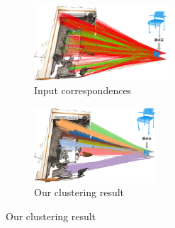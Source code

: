 \begin{figure}[ht]
    \centering
    \begin{subfigure}{0.41\textwidth}
        \centering
        \includegraphics[height=2.8cm]{images/scan2cad-cad-input-corrs.png}
          \caption{Input correspondences}
          \label{fig:scan2cad_cad-input-corrs}
      \end{subfigure}
      \begin{subfigure}{0.41\textwidth}
        \centering
        \includegraphics[height=2.8cm]{images/scan2cad-cad-cluster-corrs.png}
          \caption{Our clustering result}
          \label{fig:scan2cad_cad-cluster-corrs}
      \end{subfigure}


\end{figure}
